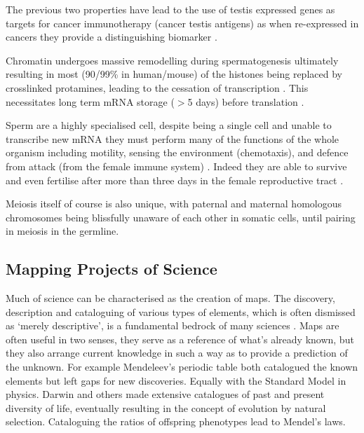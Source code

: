  The previous two properties have lead to the use of testis expressed genes as targets for cancer immunotherapy (cancer testis antigens) as when re-expressed in cancers they provide a distinguishing biomarker \parencite{Whitehurst2014Cause}.

Chromatin undergoes massive remodelling during spermatogenesis ultimately resulting in most (90/99\% in human/mouse) of the histones being replaced by crosslinked protamines, leading to the cessation of transcription \parencite{Rathke2014Chromatin}. This necessitates long term mRNA storage ($>$5 days) before translation \parencite{Kleene2013Connecting}.

Sperm are a highly specialised cell, despite being a single cell and unable to transcribe new mRNA they must perform many of the functions of the whole organism including motility, sensing the environment (chemotaxis), and defence from attack (from the female immune system) \parencite{Kaupp2008Mechanisms, Thompson1992Leukocytic}. Indeed they are able to survive and even fertilise after more than three days in the female reproductive tract \parencite{Gould1984Assessment,Wilcox1995Timing}.

Meiosis itself of course is also unique, with paternal and maternal homologous chromosomes being blissfully unaware of each other in somatic cells, until pairing in meiosis in the germline.



\subsection{Mapping Projects of Science}
Much of science can be characterised as the creation of maps. The discovery, description and cataloguing of various types of elements, which is often dismissed as `merely descriptive', is a fundamental bedrock of many sciences \parencite{Grimaldi2007Why}. Maps are often useful in two senses, they serve as a reference of what's already known, but they also arrange current knowledge in such a way as to provide a prediction of the unknown. For example Mendeleev's periodic table both catalogued the known elements but left gaps for new discoveries. Equally with the Standard Model in physics. Darwin and others made extensive catalogues of past and present diversity of life, eventually resulting in the concept of evolution by natural selection. Cataloguing the ratios of offspring phenotypes lead to Mendel's laws.

